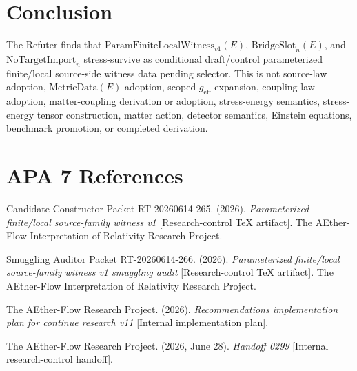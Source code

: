 \documentclass[11pt]{article}
\newcommand{\MetricData}{\mathrm{MetricData}}
\newcommand{\geff}{g_{\mathrm{eff}}}
\newcommand{\PFLFW}{\mathrm{ParamFiniteLocalWitness}_{v1}}
\newcommand{\BridgeSlot}{\mathrm{BridgeSlot}}
\newcommand{\NoTargetImport}{\mathrm{NoTargetImport}}
\begin{document}
\section{Conclusion}

The Refuter finds that \(\PFLFW(E)\), \(\BridgeSlot_n(E)\), and
\(\NoTargetImport_n\) stress-survive as conditional draft/control
parameterized finite/local source-side witness data pending selector. This is
not source-law adoption, \(\MetricData(E)\) adoption, scoped-\(\geff\)
expansion, coupling-law adoption, matter-coupling derivation or adoption,
stress-energy semantics, stress-energy tensor construction, matter action,
detector semantics, Einstein equations, benchmark promotion, or completed
derivation.

\section{APA 7 References}

Candidate Constructor Packet RT-20260614-265. (2026). \emph{Parameterized
finite/local source-family witness v1} [Research-control TeX artifact]. The
AEther-Flow Interpretation of Relativity Research Project.

Smuggling Auditor Packet RT-20260614-266. (2026). \emph{Parameterized
finite/local source-family witness v1 smuggling audit} [Research-control TeX
artifact]. The AEther-Flow Interpretation of Relativity Research Project.

The AEther-Flow Research Project. (2026). \emph{Recommendations
implementation plan for continue research v11} [Internal implementation
plan].

The AEther-Flow Research Project. (2026, June 28). \emph{Handoff 0299}
[Internal research-control handoff].
\end{document}

